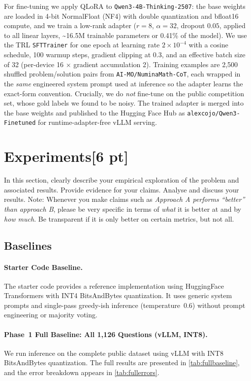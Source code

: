 \documentclass{article}
\begin{document}
For fine-tuning we apply QLoRA to \texttt{Qwen3-4B-Thinking-2507}: the base weights are loaded in
4-bit NormalFloat (NF4) with double quantization and bfloat16 compute, and we train a low-rank
adapter ($r{=}8$, $\alpha{=}32$, dropout $0.05$, applied to all linear layers, \textasciitilde16.5M
trainable parameters or 0.41\% of the model). We use the TRL \texttt{SFTTrainer} for one epoch at
learning rate $2\!\times\!10^{-4}$ with a cosine schedule, 100 warmup steps, gradient clipping at
0.3, and an effective batch size of 32 (per-device 16 $\times$ gradient accumulation 2). Training
examples are 2{,}500 shuffled problem/solution pairs from \texttt{AI-MO/NuminaMath-CoT}, each
wrapped in the \emph{same} engineered system prompt used at inference so the adapter learns the
exact-form convention. Crucially, we do \emph{not} fine-tune on the public competition set, whose
gold labels we found to be noisy. The trained adapter is merged into the base weights and published
to the Hugging Face Hub as \texttt{alexcojo/Qwen3-Finetuned} for runtime-adapter-free vLLM serving.

\section{Experiments[6 pt]}
\label{sec:experiments}
% 
In this section, clearly describe your empirical exploration of the problem and associated results. Provide evidence for your claims.
Analyse and discuss your results.
Note: Whenever you make claims such as \textit{Approach A performs ``better'' than approach B}, please be very specific in terms of \emph{what} it is better at and by \emph{how much}. Be transparent if it is only better on certain metrics, but not all.
\subsection{Baselines}
\label{sec:baselines}

\paragraph{Starter Code Baseline.}
The starter code provides a reference implementation using HuggingFace Transformers with INT4 BitsAndBytes quantization. It uses generic system prompts and single-pass greedy-ish inference (temperature~0.6) without prompt engineering or majority voting.

\paragraph{Phase~1 Full Baseline: All 1,126 Questions (vLLM, INT8).}
We run inference on the complete public dataset using vLLM with INT8 BitsAndBytes quantization. The full results are presented in \cref{tab:fullbaseline}, and the error breakdown appears in \cref{tab:fullerrors}.
\end{document}
